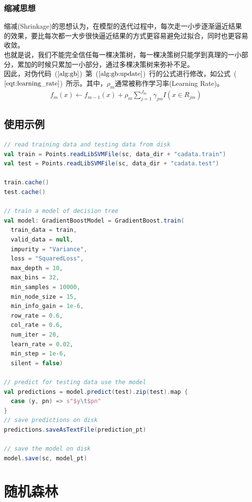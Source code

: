 \documentclass[a4paper,11pt,         %
               ]{article}
\begin{document}
\subsubsection{缩减思想}

缩减(Shrinkage)的思想认为，在模型的迭代过程中，每次走一小步逐渐逼近结果的效果，要比每次都一大步很快逼近结果的方式更容易避免过拟合，同时也更容易收敛。 \\

也就是说，我们不能完全信任每一棵决策树，每一棵决策树只能学到真理的一小部分，累加的时候只累加一小部分，通过多棵决策树来弥补不足。 \\

因此，对伪代码~($\ref{alg:gb}$)~第~($\ref{alg:gb:update}$)~行的公式进行修改，如公式~($\ref{eqt:learning_rate}$)~所示。其中，$\rho_{m}$通常被称作学习率(Learning Rate)。
\begin{eqnarray}
	\label{eqt:learning_rate}
	f_{m}\left ( x \right ) \gets f_{m-1}\left ( x \right ) + \rho_{m} \sum_{j=1}^{J_{m}} \gamma_{jm}I\left ( x \in R_{jm} \right )
\end{eqnarray}

\subsection{使用示例}

\begin{lstlisting}[language={SCALA},title={RunGradientBoostDemo.scala}]  
// read training data and testing data from disk
val train = Points.readLibSVMFile(sc, data_dir + "cadata.train")
val test = Points.readLibSVMFile(sc, data_dir + "cadata.test")

train.cache()
test.cache()

// train a model of decision tree
val model: GradientBoostModel = GradientBoost.train(
  train_data = train,
  valid_data = null,
  impurity = "Variance",
  loss = "SquaredLoss",
  max_depth = 10,
  max_bins = 32,
  min_samples = 10000,
  min_node_size = 15,
  min_info_gain = 1e-6,
  row_rate = 0.6,
  col_rate = 0.6,
  num_iter = 20,
  learn_rate = 0.02,
  min_step = 1e-6, 
  silent = false)

// predict for testing data use the model
val predictions = model.predict(test).zip(test).map {
  case (y, pn) => s"$y\t$pn"
}
// save predictions on disk
predictions.saveAsTextFile(prediction_pt)

// save the model on disk
model.save(sc, model_pt)
\end{lstlisting}  

\section{随机森林}
\end{document}
